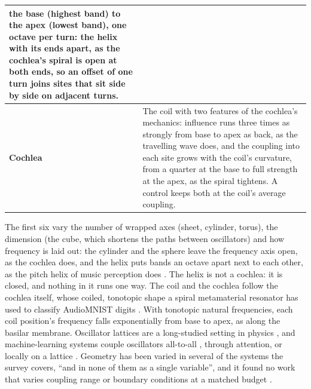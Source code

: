 \documentclass{article}
\begin{document}
\begin{longtable}[]{@{}
  >{\raggedright\arraybackslash}p{}
  >{\raggedright\arraybackslash}p{}@{}}
the base (highest band) to the apex (lowest band), one octave per turn:
the helix with its ends apart, as the cochlea's spiral is open at both
ends, so an offset of one turn joins sites that sit side by side on
adjacent turns. \\
\cmidrule{1-2}\textbf{Cochlea} & The coil with two features of the
cochlea's mechanics: influence runs three times as strongly from base to
apex as back, as the travelling wave does, and the coupling into each
site grows with the coil's curvature, from a quarter at the base to full
strength at the apex, as the spiral tightens. A control keeps both at
the coil's average coupling. \\
\end{longtable}

The first six vary the number of wrapped axes (sheet, cylinder, torus),
the dimension (the cube, which shortens the paths between oscillators)
and how frequency is laid out: the cylinder and the sphere leave the
frequency axis open, as the cochlea does, and the helix puts bands an
octave apart next to each other, as the pitch helix of music perception
does \citep{shepard1982}. The helix is not a cochlea: it is closed, and
nothing in it runs one way. The coil and the cochlea follow the cochlea
itself, whose coiled, tonotopic shape a spiral metamaterial resonator
has used to classify AudioMNIST digits \citep{beoletto2026}. With
tonotopic natural frequencies, each coil position's frequency falls
exponentially from base to apex, as along the basilar membrane.
Oscillator lattices are a long-studied setting in physics
\citep{sakaguchi1987}, and machine-learning systems couple oscillators
all-to-all \citep{unconv-ai2026}, through attention, or locally on a
lattice \citep{keller2023, miyato2025}. Geometry has been varied in
several of the systems the survey covers, ``and in none of them as a
single variable'', and it found no work that varies coupling range or
boundary conditions at a matched budget \citep{kryski2026}.
\end{document}
